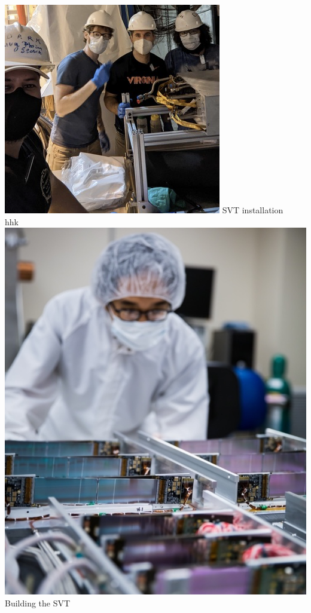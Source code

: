 \begin{poster}
{			\hspace{0.01\columnwidth}%
			\begin{minipage}{0.27\columnwidth}
				\centering
				\includegraphics[width=\columnwidth]{figs/SVT_push.png}
				SVT installation\\
				{\color{white} hhk\\}
				\includegraphics[width=\columnwidth]{figs/SVT_nice.jpeg}
				Building the SVT
			\end{minipage}%
		}



\end{poster}
